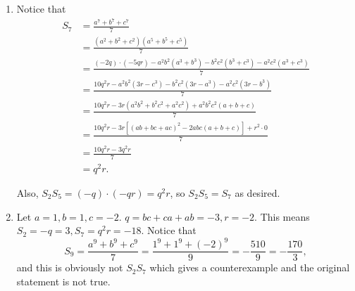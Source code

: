\begin{enumerate}
    \item Notice that
          \begin{align*}
              S_7 & = \frac{a^7 + b^7 + c^7}{7}                                                                      \\
                  & = \frac{(a^2 + b^2 + c^2)(a^5 + b^5 + c^5)}{7}                                                   \\
                  & = \frac{(-2q) \cdot (-5qr) - a^2 b^2 (a^3 + b^3) - b^2 c^2 (b^3 + c^3) - a^2 c^2 (a^3 + c^3)}{7} \\
                  & = \frac{10q^2 r - a^2 b^2 (3r - c^3) - b^2 c^2 (3r - a^3) - a^2 c^2 (3r - b^3)}{7}               \\
                  & = \frac{10q^2 r - 3r (a^2b^2 + b^2 c^2 + a^2 c^2) + a^2 b^2 c^2 (a + b + c)}{7}                  \\
                  & = \frac{10q^2 r - 3r\left[(ab + bc + ac)^2 - 2abc(a + b + c)\right] + r^2 \cdot 0}{7}            \\
                  & = \frac{10q^2 r - 3q^2r}{7}                                                                      \\
                  & = q^2r.
          \end{align*}

          Also, \(S_2 S_5 = (-q) \cdot (-qr) = q^2 r\), so \(S_2 S_5 = S_7\) as desired.

    \item Let \(a = 1, b = 1, c = -2\). \(q = bc + ca + ab = -3, r = -2\). This means \(S_2 = -q = 3, S_7 = q^2 r  = -18\). Notice that
          \[
              S_9 = \frac{a^9 + b^9 + c^9}{7} = \frac{1^9 + 1^9 + (-2)^9}{9} = - \frac{510}{9} = - \frac{170}{3},
          \]
          and this is obviously not \(S_2 S_7\) which gives a counterexample and the original statement is not true.
\end{enumerate}